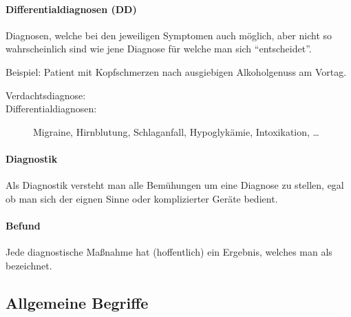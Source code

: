 \paragraph{Differentialdiagnosen (DD)} \index{} Diagnosen,
welche bei den jeweiligen Symptomen auch
möglich, aber nicht so wahrscheinlich sind wie jene
Diagnose für welche man sich ``entscheidet''.

Beispiel: Patient mit Kopfschmerzen nach ausgiebigen
Alkoholgenuss am Vortag.
\begin{description}
    \item[Verdachtsdiagnose:] 
    \item[Differentialdiagnosen:]
    Migraine, Hirnblutung, Schlaganfall,
    Hypoglykämie, Intoxikation, \ldots
\end{description}


\paragraph{Diagnostik}

Als Diagnostik versteht man alle Bemühungen um eine Diagnose zu stellen, egal
ob man sich der eignen Sinne oder komplizierter Geräte
bedient.

\paragraph{Befund}

Jede diagnostische Maßnahme hat (hoffentlich) ein Ergebnis, welches man als
 bezeichnet. 



\subsection{Allgemeine Begriffe}

